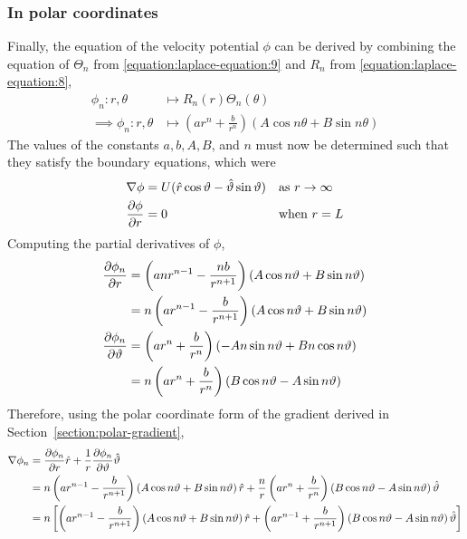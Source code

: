 \subsubsection{In polar coordinates}\label{section:VELOCITY:POLAR}
Finally, the equation of the velocity potential $\phi$ can be derived by combining the equation of $\Theta_n$ from \eqref{equation:laplace-equation:9}
and $R_n$ from \eqref{equation:laplace-equation:8},
\begin{align*}
    \phi_n:r,\theta&\mapsto R_n(r)\Theta_n(\theta)\\
    \implies\phi_n:r,\theta&\mapsto\left(ar^n+\frac{b}{r^n}\right)\left(A\cos n\theta+B\sin n\theta\right)
\end{align*}
The values of the constants $a,b,A,B$, and $n$ must now be determined such that they satisfy the boundary equations, which were 
\begin{align*}
    \nabla\phi&=U(\hat{r}\cos\vartheta-\hat{\vartheta}\sin\vartheta) &&\text{as $r\rightarrow\infty$}\\
    \pdv{\phi}{r}&=0                                        &&\text{when $r=L$}
\end{align*}
Computing the partial derivatives of $\phi$,
\begin{align*}
    \pdv{\phi_n}{r}&=\left(anr^{n-1}-\frac{nb}{r^{n+1}}\right)\left(A\cos n\vartheta+B\sin n\vartheta\right)\\
    &=n\left(ar^{n-1}-\frac{b}{r^{n+1}}\right)\left(A\cos n\vartheta+B\sin n\vartheta\right)\\
    \pdv{\phi_n}{\vartheta}&=\left(ar^n+\frac{b}{r^n}\right)\left(-An\sin n\vartheta+Bn\cos n\vartheta\right)\\
    &=n\left(ar^n+\frac{b}{r^n}\right)\left(B\cos n\vartheta-A\sin n\vartheta\right)\\
\end{align*}
Therefore, using the polar coordinate form of the gradient derived in Section~\ref{section:polar-gradient},
\begin{align*}
    \nabla\phi_n&=\pdv{\phi_n}{r}\hat{r}+\frac{1}{r}\pdv{\phi_n}{\vartheta}\hat{\vartheta}\\
    &=n\left(ar^{n-1}-\frac{b}{r^{n+1}}\right)\left(A\cos n\vartheta+B\sin n\vartheta\right)\hat{r}+\frac{n}{r}\left(ar^n+\frac{b}{r^n}\right)\left(B\cos n\vartheta-A\sin n\vartheta\right)\hat{\vartheta}\\
    &=n\left[\left(ar^{n-1}-\frac{b}{r^{n+1}}\right)\left(A\cos n\vartheta+B\sin n\vartheta\right)\hat{r}+\left(ar^{n-1}+\frac{b}{r^{n+1}}\right)\left(B\cos n\vartheta-A\sin n\vartheta\right)\hat{\vartheta}\right]\\
\end{align*}
